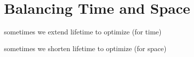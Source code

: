 \chapter{Balancing Time and Space}
\label{balance-time-and-space}

sometimes we extend lifetime to optimize (for time)

sometimes we shorten lifetime to optimize (for space)